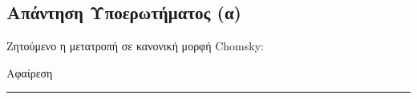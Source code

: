 \subsection{Απάντηση Υποερωτήματος (α)}
\label{ssec:Solution_4.1}
\doublespacing

Ζητούμενο η μετατροπή σε κανονική μορφή Chomsky:

\par
Αφαίρεση




\begin{center}
	\noindent\rule{\linewidth}{0.5pt}
\end{center}
